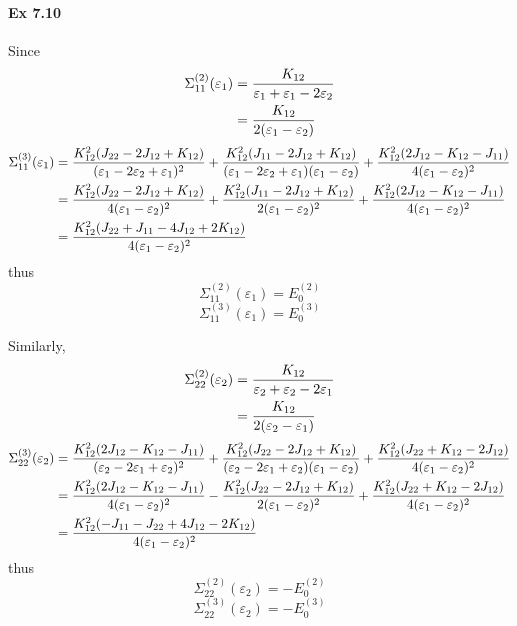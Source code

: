 \documentclass[a4paper]{article}
\newcommand{\ex}[1]{\paragraph{Ex #1}}
\numberwithin{equation}{subsection}
\begin{document}
\ex{7.10}
Since
\begin{align}
\Sigma_{11}^{(2)}(\varepsilon_1) &= \dfrac{K_{12}}{\varepsilon_1 + \varepsilon_1 - 2\varepsilon_2} \notag\\
&= \dfrac{K_{12}}{2(\varepsilon_1 - \varepsilon_2)} 
\end{align}
\begin{align}
\Sigma_{11}^{(3)}(\varepsilon_1) &= 
\dfrac{K_{12}^2 (J_{22} - 2J_{12} + K_{12})}{(\varepsilon_1 - 2\varepsilon_2 + \varepsilon_1)^2} 
+ \dfrac{K_{12}^2 (J_{11} - 2J_{12} + K_{12})}{(\varepsilon_1 - 2\varepsilon_2 + \varepsilon_1)(\varepsilon_1 - \varepsilon_2)}
+ \dfrac{K_{12}^2 (2J_{12} - K_{12} - J_{11})}{4(\varepsilon_1 - \varepsilon_2)^2} \notag\\
&= \dfrac{K_{12}^2 (J_{22} - 2J_{12} + K_{12})}{4(\varepsilon_1 - \varepsilon_2)^2} 
+ \dfrac{K_{12}^2 (J_{11} - 2J_{12} + K_{12})}{2(\varepsilon_1 - \varepsilon_2)^2}
+ \dfrac{K_{12}^2 (2J_{12} - K_{12} - J_{11})}{4(\varepsilon_1 - \varepsilon_2)^2} \notag\\
&= \dfrac{K_{12}^2 (J_{22}  + J_{11} - 4J_{12} + 2K_{12}  )}{4(\varepsilon_1 - \varepsilon_2)^2} 
\end{align}
thus
\begin{equation}\label{key}
\Sigma_{11}^{(2)}(\varepsilon_1)  = E_0^{(2)}
\end{equation}
\begin{equation}\label{key}
\Sigma_{11}^{(3)}(\varepsilon_1) = E_0^{(3)}
\end{equation}

Similarly,
\begin{align}
\Sigma_{22}^{(2)}(\varepsilon_2) &= \dfrac{K_{12}}{\varepsilon_2 + \varepsilon_2 - 2\varepsilon_1} \notag\\
&= \dfrac{K_{12}}{2(\varepsilon_2 - \varepsilon_1)} 
\end{align}
\begin{align}
\Sigma_{22}^{(3)}(\varepsilon_2) &= 
\dfrac{K_{12}^2 (2J_{12} - K_{12} - J_{11})}{(\varepsilon_2 - 2\varepsilon_1 + \varepsilon_2)^2} 
+ \dfrac{K_{12}^2 (J_{22} - 2J_{12} + K_{12})}{(\varepsilon_2 - 2\varepsilon_1 + \varepsilon_2)(\varepsilon_1 - \varepsilon_2)}
+ \dfrac{K_{12}^2 (J_{22} + K_{12} - 2J_{12})}{4(\varepsilon_1 - \varepsilon_2)^2} \notag\\
&= \dfrac{K_{12}^2 (2J_{12} - K_{12} - J_{11})}{4(\varepsilon_1 - \varepsilon_2)^2} 
- \dfrac{K_{12}^2 (J_{22} - 2J_{12} + K_{12})}{2(\varepsilon_1 - \varepsilon_2)^2}
+ \dfrac{K_{12}^2 (J_{22} + K_{12} - 2J_{12})}{4(\varepsilon_1 - \varepsilon_2)^2} \notag\\
&= \dfrac{K_{12}^2 (  - J_{11} - J_{22} + 4J_{12} - 2K_{12}  )}{4(\varepsilon_1 - \varepsilon_2)^2} 
\end{align}
thus
\begin{equation}\label{key}
\Sigma_{22}^{(2)}(\varepsilon_2)  = -E_0^{(2)}
\end{equation}
\begin{equation}\label{key}
\Sigma_{22}^{(3)}(\varepsilon_2) = -E_0^{(3)}
\end{equation}
\end{document}
